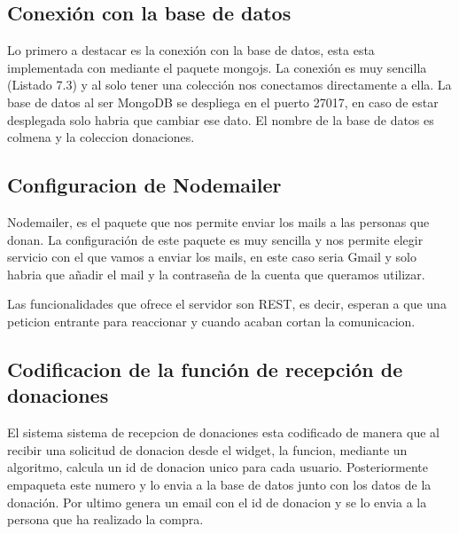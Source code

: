 
\subsection{Conexión con la base de datos}

Lo primero a destacar es la conexión con la base de datos, esta esta implementada con mediante el paquete mongojs. La conexión es muy sencilla (Listado 7.3) y al solo tener una colección nos conectamos directamente a ella. La  base de datos al ser MongoDB se despliega en el puerto 27017, en caso de estar desplegada solo habria que cambiar ese dato. El nombre de la base de datos es colmena y la coleccion donaciones.\\


\subsection{Configuracion de Nodemailer}
Nodemailer, es el paquete que nos permite enviar los mails a las personas que donan. La configuración de este paquete es muy sencilla y nos permite elegir servicio con el que vamos a enviar los mails, en este caso seria Gmail y solo habria que añadir el mail y la contraseña de la cuenta que queramos utilizar.\\


Las funcionalidades que ofrece el servidor son REST, es decir, esperan a que una peticion entrante para reaccionar y cuando acaban cortan la comunicacion. 

\subsection{Codificacion de la función de recepción de donaciones}
El sistema sistema de recepcion de donaciones esta codificado de manera que al recibir una solicitud de donacion desde el widget, la funcion, mediante un algoritmo, calcula un id de donacion unico para cada usuario. Posteriormente empaqueta este numero y lo envia a la base de datos junto con los datos de la donación. Por ultimo genera un email con el id de donacion y se lo envia a la persona que ha realizado la compra.\\


